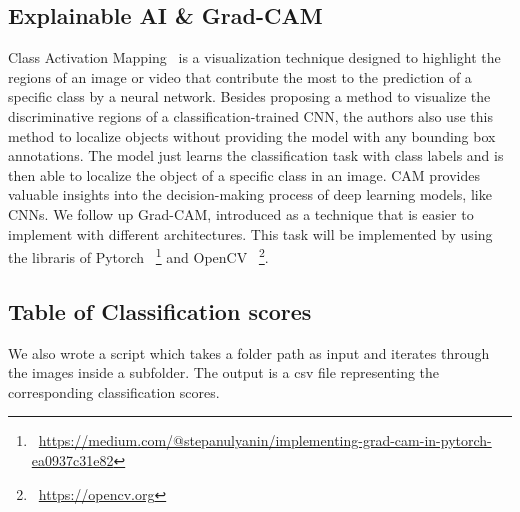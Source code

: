 \subsection{Explainable AI \& Grad-CAM}
\label{sec:optim:cam}
Class Activation Mapping~\cite{ZhouKLOT16} is a visualization technique designed to highlight the regions of an image or video that contribute the most to the prediction of a specific class by a neural network. 
Besides proposing a method to visualize the discriminative regions of a classification-trained CNN, the authors also use this method to localize objects without providing the model with any bounding box annotations. 
The model just learns the classification task with class labels and is then able to localize the object of a specific class in an image. 
CAM provides valuable insights into the decision-making process of deep learning models, like CNNs.
We follow up Grad-CAM\cite{almeida_grad-cam_2023}, introduced as a technique that is easier to implement with different architectures.
This task will be implemented by using the libraris of Pytorch
~\footnote{~\url{https://medium.com/@stepanulyanin/implementing-grad-cam-in-pytorch-ea0937c31e82}}
and OpenCV
~\footnote{~\url{https://opencv.org}}.

\subsection{Table of Classification scores}
\label{sec:optim:csv}
We also wrote a script which takes a folder path as input and iterates through the images inside a subfolder. 
The output is a csv file representing the corresponding classification scores. 

